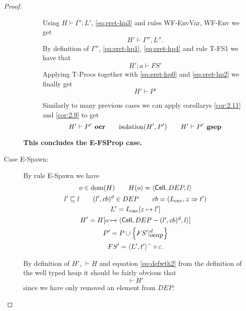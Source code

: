 \begin{proof}
\begin{description}
\begin{description}
          Using $H \vdash \Gamma'; L'$, \eqref{eq:eret-hp3} and rules {\sc WF-EnvVar}, {\sc
          WF-Env} we get
          \begin{equation} \label{eq:eret-hp4}
            H' \vdash \Gamma'', L''.
          \end{equation}
          By definition of $\Gamma''$, \eqref{eq:eret-hp1}, \eqref{eq:eret-hp4}
          and rule {\sc T-FS1} we have that
          \begin{equation} \label{eq:eret-hp2}
            H';a \vdash FS'
          \end{equation}
          Applying {\sc T-Procs} together with \eqref{eq:eret-hp0} and
          \eqref{eq:eret-hp2} we finally get
          \begin{equation}
            H' \vdash P'
          \end{equation}

          Similarly to many previous cases we can apply corollarys
          \ref{cor:2.11} and \ref{cor:2.9} to get
          \begin{equation*}
            H' \vdash P' \:\: \mbox{\bf ocr} \quad\quad \mbox{$\mathrm{isolation}$}(H', P') \quad\quad H'
            \vdash P' \:\: \mbox{\bf gsep}
          \end{equation*}
      \end{description}
      {\bf This concludes the {\sc E-FSProp} case.}
      
    \item[Case {\sc E-Spawn}:] By rule {\sc E-Spawn} we have
      \begin{equation}
        \begin{gathered} \label{eq:espawn1}
          o \in \mbox{$\mathrm{dom}$}(H) \quad\quad H(o) = \mbox{$\langle \mbox{$\mathsf{Cell}$}{}, DEP, l \rangle$} \\
          l' \sqsubseteq l \quad\quad (l', cb)^d \in DEP \quad\quad cb =
          (L_{\text{env}}, z \Rightarrow t') \\
          L' = L_{\text{env}}[z \mapsto l'] \\
          H' = H[o \mapsto \mbox{$\langle \mbox{$\mathsf{Cell}$}{}, DEP - (l', cb)^d, l \rangle$}] \\
          P' = P \cup \left\{ FS'|_{\mbox{$ocap$}}^d \right\} \\
          FS' = \mbox{$\langle L', t' \rangle$}^- \circ \varepsilon.
        \end{gathered}
      \end{equation}
      
      By definition of $H'$, $\vdash H$ and equation \eqref{eq:defwth2} from the
      definition of the well typed heap it should be fairly obvious that
      \begin{equation}
        \vdash H'
      \end{equation}
      since we have only removed an element from $DEP$. 



\end{description}
\end{proof}
